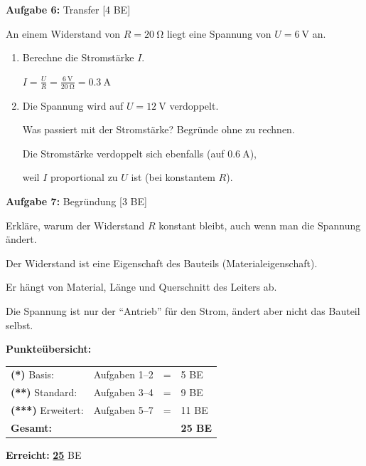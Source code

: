 \documentclass[11pt, a4paper]{article}
\newcommand{\lsg}[1]{\textcolor{loesung}{\textbf{\underline{#1}}}}
\newcommand{\niveauEins}{\textcolor{stern1}{\textbf{(*)}}}
\newcommand{\niveauZwei}{\textcolor{stern2}{\textbf{(**)}}}
\newcommand{\niveauDrei}{\textcolor{stern3}{\textbf{(***)}}}}
\newcommand{\punkte}[1]{\hfill\textcolor{grau}{\small[#1 BE]}}
\begin{document}
\textbf{Aufgabe 6:} Transfer \punkte{4}

An einem Widerstand von $R = \SI{20}{\ohm}$ liegt eine Spannung von $U = \SI{6}{\volt}$ an.

\begin{enumerate}[label=\alph*)]
    \item Berechne die Stromstärke $I$.

    \textcolor{loesung}{$I = \frac{U}{R} = \frac{\SI{6}{\volt}}{\SI{20}{\ohm}} = \SI{0,3}{\ampere}$}

    \vspace{0.5em}

    \item Die Spannung wird auf $U = \SI{12}{\volt}$ verdoppelt.

    Was passiert mit der Stromstärke? Begründe ohne zu rechnen.

    \textcolor{loesung}{Die Stromstärke verdoppelt sich ebenfalls (auf $\SI{0,6}{\ampere}$),}

    \textcolor{loesung}{weil $I$ proportional zu $U$ ist (bei konstantem $R$).}
\end{enumerate}

\vspace{1em}

\textbf{Aufgabe 7:} Begründung \punkte{3}

Erkläre, warum der Widerstand $R$ konstant bleibt, auch wenn man die Spannung ändert.

\textcolor{loesung}{Der Widerstand ist eine Eigenschaft des Bauteils (Materialeigenschaft).}

\textcolor{loesung}{Er hängt von Material, Länge und Querschnitt des Leiters ab.}

\textcolor{loesung}{Die Spannung ist nur der ``Antrieb'' für den Strom, ändert aber nicht das Bauteil selbst.}

\vspace{1.5em}


\begin{tcolorbox}[colback=hellgrau, colframe=grau, boxrule=0.5pt, arc=0pt]
\small
\textbf{Punkteübersicht:}

\begin{tabular}{llcl}
\niveauEins{} Basis: & Aufgaben 1--2 & = & 5 BE \\
\niveauZwei{} Standard: & Aufgaben 3--4 & = & 9 BE \\
\niveauDrei{} Erweitert: & Aufgaben 5--7 & = & 11 BE \\
\hline
\textbf{Gesamt:} & & & \textbf{25 BE}
\end{tabular}
\hfill
\textbf{Erreicht:} \lsg{25} BE
\end{tcolorbox}
\end{document}
